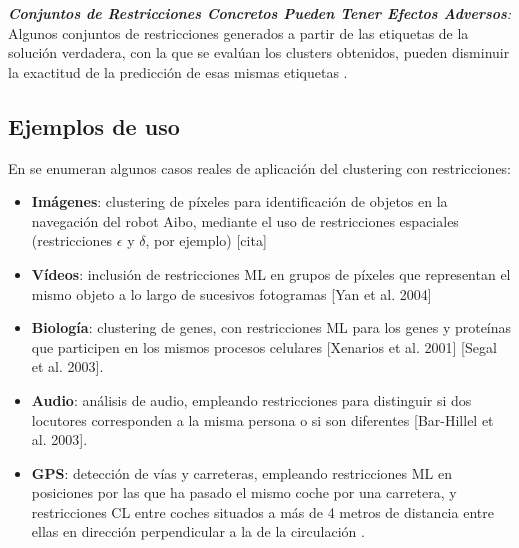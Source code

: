 \begin{observacion}
 \emph{\textbf{Conjuntos de Restricciones Concretos Pueden Tener Efectos Adversos}:} Algunos conjuntos de restricciones generados a partir de las etiquetas de la solución verdadera, con la que se evalúan los clusters obtenidos, pueden disminuir la exactitud de la predicción de esas mismas etiquetas \cite{davidson2007survey}.
\end{observacion}


\subsection{Ejemplos de uso}

En \cite{davidson2007survey} se enumeran algunos casos reales de aplicación del clustering con restricciones:
\begin{itemize}
	\item \textbf{Imágenes}: clustering de píxeles para identificación de objetos en la navegación del robot Aibo, mediante el uso de restricciones espaciales (restricciones $\epsilon$ y $\delta$, por ejemplo) [cita]
	\item \textbf{Vídeos}: inclusión de restricciones ML en grupos de píxeles que representan el mismo objeto a lo largo de sucesivos fotogramas [Yan et al. 2004]
	\item \textbf{Biología}: clustering de genes, con restricciones ML para los genes y proteínas que participen en los mismos procesos celulares [Xenarios et al. 2001] [Segal et al. 2003].
	\item \textbf{Audio}: análisis de audio, empleando restricciones para distinguir si dos locutores corresponden a la misma persona o si son diferentes [Bar-Hillel et al. 2003].
	\item \textbf{GPS}: detección de vías y carreteras, empleando restricciones ML en posiciones por las que ha pasado el mismo coche por una carretera, y restricciones CL entre coches situados a más de 4 metros de distancia entre ellas en dirección perpendicular a la de la circulación \cite{wagstaff2001constrained}.
\end{itemize}

